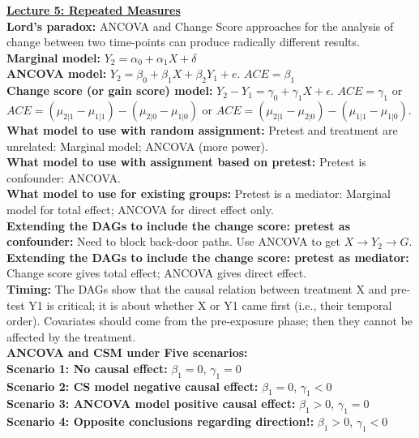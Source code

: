 \documentclass[a4paper,7pt,landscape]{extarticle}
\begin{document}
\begin{multicols}{3}
\begin{boxA}
\end{boxA}

\begin{boxA}
\underline{\textbf{Lecture 5: Repeated Measures}}\\
\textbf{Lord's paradox:} ANCOVA and Change Score approaches for the analysis of change between two time-points can produce radically different results.\\
\textbf{Marginal model:} $Y_2 = \alpha_0 + \alpha_1 X + \delta$\\
\textbf{ANCOVA model:} $Y_2 = \beta_0 + \beta_1 X + \beta_2 Y_1 + e$. $ACE = \beta_1$\\
\textbf{Change score (or gain score) model:} $Y_2 - Y_1 = \gamma_0 + \gamma_1 X + \epsilon$. $ACE = \gamma_1$ or $ACE = (\mu_{2|1} - \mu_{1|1}) - (\mu_{2|0} - \mu_{1|0})$ or $ACE = (\mu_{2|1} - \mu_{2|0}) - (\mu_{1|1} - \mu_{1|0})$.\\
\textbf{What model to use with random assignment:} Pretest and treatment are unrelated: Marginal model; ANCOVA (more power).\\
\textbf{What model to use with assignment based on pretest:} Pretest is confounder: ANCOVA.\\
\textbf{What model to use for existing groups:} Pretest is a mediator: Marginal model for total effect; ANCOVA for direct effect only.\\
\textbf{Extending the DAGs to include the change score: pretest as confounder:} Need to block back-door paths. Use ANCOVA to get $X \rightarrow Y_2 \rightarrow G$.\\
\textbf{Extending the DAGs to include the change score: pretest as mediator:} Change score gives total effect; ANCOVA gives direct effect.\\
\textbf{Timing:} The DAGs show that the causal relation between treatment X and pre-test Y1 is critical; it is about whether X or Y1 came first (i.e., their temporal order). Covariates should come from the pre-exposure phase; then they cannot be affected by the treatment.\\
\textbf{ANCOVA and CSM under Five scenarios:}\\
\textbf{Scenario 1: No causal effect:} $\beta_1 = 0$, $\gamma_1 = 0$\\
\textbf{Scenario 2: CS model negative causal effect:} $\beta_1 = 0$, $\gamma_1 < 0$\\
\textbf{Scenario 3: ANCOVA model positive causal effect:} $\beta_1 > 0$, $\gamma_1 = 0$\\
\textbf{Scenario 4: Opposite conclusions regarding direction!:} $\beta_1 > 0$, $\gamma_1 < 0$\\

\end{boxA}
\end{multicols}
\end{document}
